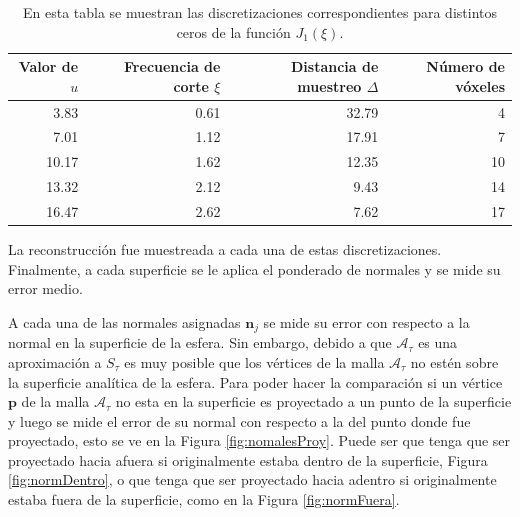 \begin{table}[htp]
\begin{center}
  \begin{tabular}{|r|r|r|r|}
    \hline
    Valor de $u$ & Frecuencia de corte $\xi$ & Distancia de muestreo $\Delta$ & Número de vóxeles \\ 
    \hline
     3.83 & 0.61 & 32.79 &  4 \\
     7.01 & 1.12 & 17.91 &  7 \\
    10.17 & 1.62 & 12.35 & 10 \\
    13.32 & 2.12 &  9.43 & 14 \\
    16.47 & 2.62 &  7.62 & 17 \\
    \hline
  \end{tabular}
\end{center}
\caption[Discretizaciones correspondientes para distintos ceros de la función $J_{1}(\xi)$]{En esta tabla se muestran las discretizaciones correspondientes para distintos ceros de la función $J_{1}(\xi)$.}
\label{table:anaFourier}
\end{table}

La reconstrucción fue muestreada a cada una de estas discretizaciones. Finalmente, a cada superficie se le aplica el ponderado de normales y se mide su error medio.

A cada una de las normales asignadas $\textbf{n}_j$ se mide su error con respecto a la normal en la superficie de la esfera. Sin embargo, debido a que $\mathcal{A}_{\tau}$ es una aproximación a $S_{\tau}$ es muy posible que los vértices de la malla $\mathcal{A}_{\tau}$ no estén sobre la superficie analítica de la esfera. Para poder hacer la comparación si un vértice $\textbf{p}$ de la malla $\mathcal{A}_{\tau}$ no esta en la superficie es proyectado a un punto de la superficie y luego se mide el error de su normal con respecto a la del punto donde fue proyectado, esto se ve en la Figura \ref{fig:nomalesProy}. Puede ser que tenga que ser proyectado hacia afuera si originalmente estaba dentro de la superficie, Figura \ref{fig:normDentro}, o que tenga que ser proyectado hacia adentro si originalmente estaba fuera de la superficie, como en la Figura \ref{fig:normFuera}.

